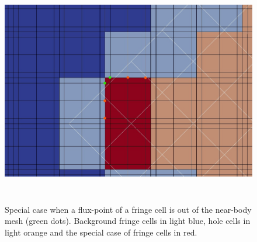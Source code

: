 \begin{figure}[H]
	\centering
	\includegraphics[height=10.0cm]{figs/results/vortex_32_10/p=3/closeup_flux_point_markers.jpg}
    \caption{Special case when a flux-point of a fringe cell is out of the near-body mesh (green dots). Background fringe cells in light blue, hole cells in light orange and the special case of fringe cells in red.}
    \label{fig:overset_vortex_special_fringes}
\end{figure}

